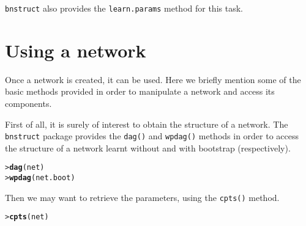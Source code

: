 \documentclass{article}\usepackage[]{graphicx}\usepackage[]{color}
\makeatletter
\newcommand{\hlstd}[1]{\textcolor[rgb]{0.345,0.345,0.345}{#1}}%
\newcommand{\hlkwd}[1]{\textcolor[rgb]{0.737,0.353,0.396}{\textbf{#1}}}%
\newenvironment{kframe}{%
 \def\at@end@of@kframe{}%
 \ifinner\ifhmode%
  \def\at@end@of@kframe{\end{minipage}}%
  \begin{minipage}{\columnwidth}%
 \fi\fi%
 \def\FrameCommand##1{\hskip\@totalleftmargin \hskip-\fboxsep
 \colorbox{shadecolor}{##1}\hskip-\fboxsep
     \hskip-\linewidth \hskip-\@totalleftmargin \hskip\columnwidth}%
 \MakeFramed {\advance\hsize-\width
   \@totalleftmargin\z@ \linewidth\hsize
   \@setminipage}}%
 {\par\unskip\endMakeFramed%
 \at@end@of@kframe}
\newenvironment{knitrout}{}{} %
\newcommand{\Robject}[1]{{\texttt{#1}}}
\newcommand{\Rpackage}[1]{{\texttt{#1}}}
\newcommand{\Rmethod}[1]{{\texttt{#1}}}
\makeatother
\begin{document}
\Rpackage{bnstruct} also provides the \Rmethod{learn.params} method for this task.

% 

\section{Using a network}
Once a network is created, it can be used. Here we briefly mention some of the basic methods provided in order to
manipulate a network and access its components.

First of all, it is surely of interest to obtain the structure of a network. The \Rpackage{bnstruct} package
provides the \Rmethod{dag()} and \Rmethod{wpdag()} methods in order to access the structure of a network learnt without and
with bootstrap (respectively).
\begin{knitrout}
\color{fgcolor}\begin{kframe}
\begin{alltt}
\hlstd{> }\hlkwd{dag}\hlstd{(net)}
\hlstd{> }\hlkwd{wpdag}\hlstd{(net.boot)}
\end{alltt}
\end{kframe}
\end{knitrout}

Then we may want to retrieve the parameters, using the \Rmethod{cpts()} method.
\begin{knitrout}
\color{fgcolor}\begin{kframe}
\begin{alltt}
\hlstd{> }\hlkwd{cpts}\hlstd{(net)}
\end{alltt}
\end{kframe}
\end{knitrout}
\end{document}
